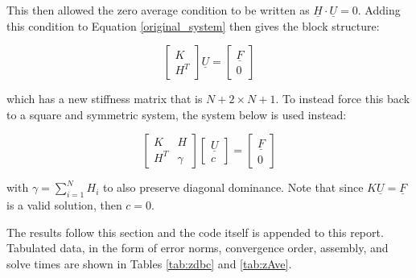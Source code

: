 \documentclass[a4paper, 12pt]{article}
\begin{document}
\noindent
This then allowed the zero average condition to be written as
$\underline{H} \cdot \underline{U} = 0$.
Adding this condition to Equation \ref{original_system}
then gives the block structure:

\begin{equation}
  \begin{bmatrix}
    K   \\
    H^T 
  \end{bmatrix}
  \underline{U} =
  \begin{bmatrix}
    \underline{F} \\
    0
  \end{bmatrix}
\end{equation}

\noindent
which has a new stiffness matrix that is $N+2 \times N+1$. 
To instead force this back to a square and symmetric system, 
the system below is used instead:

\begin{equation}
  \begin{bmatrix}
    K   & H \\
    H^T & \gamma
  \end{bmatrix}
  \begin{bmatrix}
    \underline{U}  \\
    c
  \end{bmatrix}
  =
  \begin{bmatrix}
    \underline{F} \\
    0
  \end{bmatrix}
\end{equation}

\noindent
with $\gamma = \sum_{i=1}^N H_i$ to also preserve
diagonal dominance. 
Note that since $K \underline{U} = \underline{F}$
is a valid solution, then $c=0$.

The results follow this section and the code itself 
is appended to this report.
Tabulated data, in the form of error norms, convergence order, 
assembly, and solve times are shown in
Tables \ref{tab:zdbc} and \ref{tab:zAve}.
\end{document}
